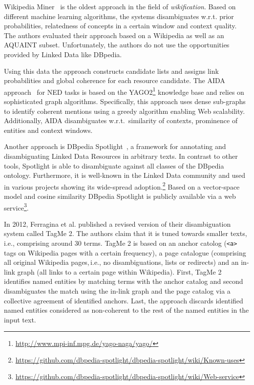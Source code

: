 \documentclass{llncs}
\begin{document}
Wikipedia Miner~\cite{milne2008learning} is the oldest approach in the field of \emph{wikification}.
Based on different machine learning algorithms, the systems disambiguates w.r.t. prior probabilities, relatedness of concepts in a certain window and context quality. 
The authors evaluated their approach based on a Wikipedia as well as an AQUAINT subset. 
Unfortunately, the authors do not use the opportunities provided by Linked Data like DBpedia.

Using this data the approach constructs candidate lists and assigns link probabilities and global coherence for each resource candidate.
The AIDA approach~\cite{AIDA} for NED tasks is based on the YAGO2\footnote{\url{http://www.mpi-inf.mpg.de/yago-naga/yago/}} knowledge base and relies on sophisticated graph algorithms. 
Specifically, this approach uses dense sub-graphs to identify coherent mentions using a greedy algorithm enabling Web scalability. 
Additionally, AIDA disambiguates w.r.t.~similarity of contexts, prominence of entities and context windows.

Another approach is DBpedia Spotlight~\cite{spotlight}, a framework for annotating and disambiguating Linked Data Resources in arbitrary texts.
In contrast to other tools, Spotlight is able to disambiguate against all classes of the DBpedia ontology.
Furthermore, it is well-known in the Linked Data community and used in various projects showing its wide-spread adoption.\footnote{\url{https://github.com/dbpedia-spotlight/dbpedia-spotlight/wiki/Known-uses}}
Based on a vector-space model and cosine similarity DBpedia Spotlight is publicly available via a web service\footnote{\url{https://github.com/dbpedia-spotlight/dbpedia-spotlight/wiki/Web-service}}.

In 2012, Ferragina et al. published a revised version of their disambiguation system called TagMe 2.
The authors claim that it is tuned towards smaller texts,\,i.e., comprising around 30 terms.
TagMe 2 is based on an anchor catolog (\texttt{<a>} tags on Wikipedia pages with a certain frequency), a page catalogue (comprising all original Wikipedia pages,\,i.e., no disambiguations, lists or redirects) and an in-link graph (all links to a certain page within Wikipedia).
First, TagMe 2 identifies named entities by matching terms with the anchor catalog and second disambiguates the match using the in-link graph and the page catalog via a collective agreement of identified anchors. 
Last, the approach discards identified named entities considered as non-coherent to the rest of the named entities in the input text.  
\end{document}
